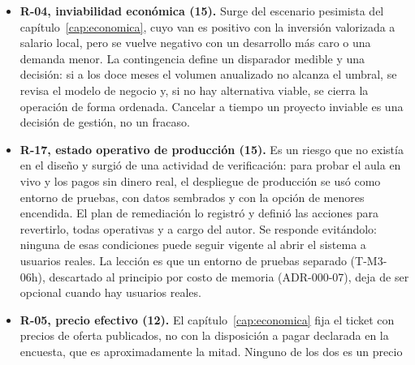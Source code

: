 \begin{itemize}
          tabla~\ref{tab:construccion}). De las pendientes, seis
          correspondían al kill-switch en el cliente y a su encendido, y
          tres se difirieron de forma explícita: la verificación
          automática de la firma digital del \gls{cap} (opcional), el
          video de presentación del tutor (fuera del \gls{mvp}) y las
          especialidades verificadas contra registros oficiales
          (ADR-M1-06). Al 19 de octubre de 2026, con el mismo criterio,
          la lista registra 234 completadas, 3 pendientes ---el entorno
          de \emph{staging}, el encendido de las clases con menores y el
          video de presentación---, 4 en curso y 1 cancelada. Cualquier funcionalidad nueva pasa al trabajo
          futuro.
    \item \textbf{R-04, inviabilidad económica (15).} Surge del escenario
          pesimista del capítulo~\ref{cap:economica}, cuyo \gls{van} es
          positivo con la inversión valorizada a salario local, pero se
          vuelve negativo con un desarrollo más caro o una demanda menor. La contingencia
          define un disparador medible y una decisión: si a los doce meses
          el volumen anualizado no alcanza el umbral, se revisa el modelo
          de negocio y, si no hay alternativa viable, se cierra la
          operación de forma ordenada. Cancelar a tiempo un proyecto
          inviable es una decisión de gestión, no un fracaso.
    \item \textbf{R-17, estado operativo de producción (15).} Es un riesgo
          que no existía en el diseño y surgió de una actividad de
          verificación: para probar el aula en vivo y los pagos sin dinero
          real, el despliegue de producción se usó como entorno de pruebas,
          con datos sembrados y con la opción de menores encendida. El plan
          de remediación lo registró y definió las acciones para revertirlo,
          todas operativas y a cargo del autor. Se responde evitándolo:
          ninguna de esas condiciones puede seguir vigente al abrir el
          sistema a usuarios reales. La lección es que un entorno de pruebas separado
          (T-M3-06h), descartado al principio por costo de memoria
          (ADR-000-07), deja de ser opcional cuando hay usuarios reales.
    \item \textbf{R-05, precio efectivo (12).} El capítulo~\ref{cap:economica}
          fija el ticket con precios de oferta publicados, no con la
          disposición a pagar declarada en la encuesta, que es
          aproximadamente la mitad. Ninguno de los dos es un precio

\end{itemize}

